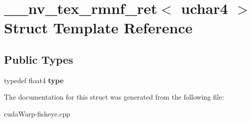 \hypertarget{struct____nv__tex__rmnf__ret_3_01uchar4_01_4}{}\section{\+\_\+\+\_\+nv\+\_\+tex\+\_\+rmnf\+\_\+ret$<$ uchar4 $>$ Struct Template Reference}
\label{struct____nv__tex__rmnf__ret_3_01uchar4_01_4}
\subsection*{Public Types}
\begin{DoxyCompactItemize}
\item 
typedef float4 {\bfseries type}\hypertarget{struct____nv__tex__rmnf__ret_3_01uchar4_01_4_a0ad2e43f0f5e5773381152eb5b911e81}{}\label{struct____nv__tex__rmnf__ret_3_01uchar4_01_4_a0ad2e43f0f5e5773381152eb5b911e81}

\end{DoxyCompactItemize}


The documentation for this struct was generated from the following file\+:\begin{DoxyCompactItemize}
\item 
cuda\+Warp-\/fisheye.\+cpp\end{DoxyCompactItemize}
